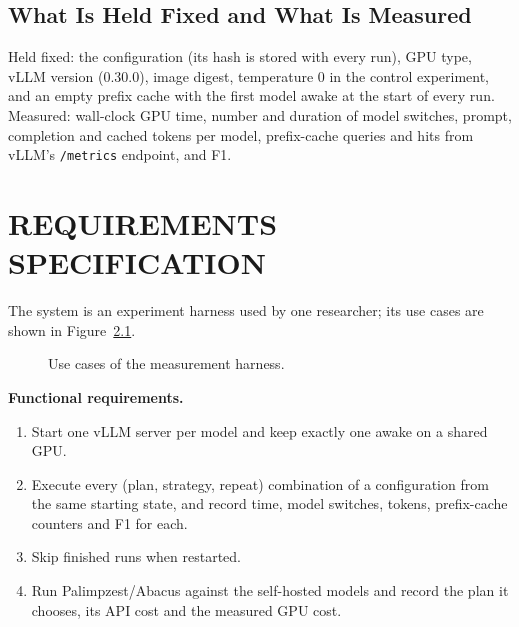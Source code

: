 \documentclass[a4paper,12pt]{report}
\newcommand{\code}[1]{\texttt{#1}}
\begin{document}
\section{What Is Held Fixed and What Is Measured}

Held fixed: the configuration (its hash is stored with every run), GPU type, vLLM version (0.30.0),
image digest, temperature 0 in the control experiment, and an empty prefix cache with the first
model awake at the start of every run. Measured: wall-clock GPU time, number and duration of model
switches, prompt, completion and cached tokens per model, prefix-cache queries and hits from vLLM's
\code{/metrics} endpoint, and F1.

\chapter{REQUIREMENTS SPECIFICATION}

The system is an experiment harness used by one researcher; its use cases are shown in
Figure~\ref{fig:usecase}.

\begin{figure}[h!]
\centering
{}
\caption{Use cases of the measurement harness.}
\label{fig:usecase}
\end{figure}

\textbf{Functional requirements.}
\begin{enumerate}
\item Start one vLLM server per model and keep exactly one awake on a shared GPU.
\item Execute every (plan, strategy, repeat) combination of a configuration from the same starting
state, and record time, model switches, tokens, prefix-cache counters and F1 for each.
\item Skip finished runs when restarted.
\item Run Palimpzest/Abacus against the self-hosted models and record the plan it chooses, its API
cost and the measured GPU cost.
\end{enumerate}
\end{document}
